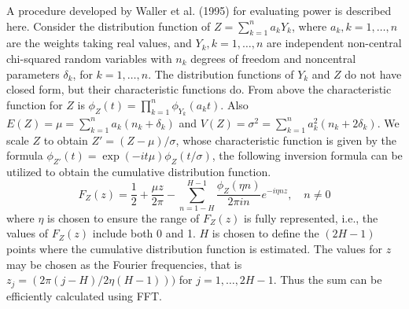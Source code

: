 A procedure developed by Waller et al.  (1995) for evaluating power is
described here.  Consider the distribution function of $Z=\sum_{k=1}^na_kY_k$,
where $a_k, k=1,\ldots, n$ are the weights taking real values, and $Y_k,
k=1,\ldots,n$ are independent non-central chi-squared random variables with
$n_k$ degrees of freedom and noncentral parameters $\delta_k$, for
$k=1,\ldots,n$.  The distribution functions of $Y_k$ and $Z$ do not have closed
form, but their characteristic functions do.  From above the characteristic
function for $Z$ is $\phi_Z(t)=\prod_{k=1}^n\phi_{Y_{k}}(a_kt)$.  Also
$E(Z)=\mu=\sum_{k=1}^na_k(n_k+\delta_k)$ and
$V(Z)=\sigma^2=\sum_{k=1}^na_k^2(n_k+2\delta_k)$.  We scale $Z$ to obtain
$Z'=(Z-\mu)/\sigma$, whose characteristic function is given by the formula
$\phi_{Z'}(t)=\exp(-it\mu)\phi_Z(t/\sigma)$, the following inversion formula
can be utilized to obtain the cumulative distribution function.
$$F_Z(z)=\frac{1}{2}+\frac{\mu
z}{2\pi}-\sum\limits_{n=1-H}^{H-1}\frac{\phi_Z(\eta n)}{2\pi in}e^{-i\eta nz},
\quad n\neq 0$$ where $\eta$ is chosen to ensure the range of $F_Z(z)$ is fully
represented, i.e., the values of $F_Z(z)$ include both 0 and 1.  $H$ is chosen
to define the $(2H-1)$ points where the cumulative distribution function is
estimated.  The values for $z$ may be chosen as the Fourier frequencies, that
is $z_j=(2\pi(j-H)/2\eta(H-1)))$ for $j=1,\ldots,2H-1$.  Thus the sum can be
efficiently calculated using FFT.
